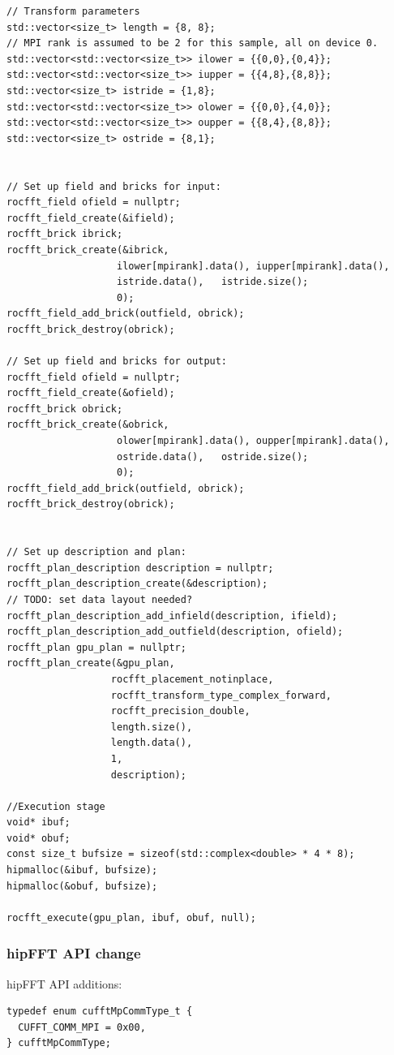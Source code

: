 \documentclass[12pt]{article}
\renewcommand{\(}{\left(}
\renewcommand{\)}{\right)}
\begin{document}
\begin{lstlisting}
// Transform parameters
std::vector<size_t> length = {8, 8};
// MPI rank is assumed to be 2 for this sample, all on device 0.
std::vector<std::vector<size_t>> ilower = {{0,0},{0,4}};
std::vector<std::vector<size_t>> iupper = {{4,8},{8,8}};
std::vector<size_t> istride = {1,8};
std::vector<std::vector<size_t>> olower = {{0,0},{4,0}};
std::vector<std::vector<size_t>> oupper = {{8,4},{8,8}};
std::vector<size_t> ostride = {8,1};


// Set up field and bricks for input:
rocfft_field ofield = nullptr;
rocfft_field_create(&ifield);
rocfft_brick ibrick;
rocfft_brick_create(&ibrick,
                   ilower[mpirank].data(), iupper[mpirank].data(),
                   istride.data(),   istride.size();
                   0);
rocfft_field_add_brick(outfield, obrick);
rocfft_brick_destroy(obrick);

// Set up field and bricks for output:
rocfft_field ofield = nullptr;
rocfft_field_create(&ofield);
rocfft_brick obrick;
rocfft_brick_create(&obrick,
                   olower[mpirank].data(), oupper[mpirank].data(),
                   ostride.data(),   ostride.size();
                   0);
rocfft_field_add_brick(outfield, obrick);
rocfft_brick_destroy(obrick);


// Set up description and plan:
rocfft_plan_description description = nullptr;
rocfft_plan_description_create(&description);
// TODO: set data layout needed?
rocfft_plan_description_add_infield(description, ifield);
rocfft_plan_description_add_outfield(description, ofield);
rocfft_plan gpu_plan = nullptr;
rocfft_plan_create(&gpu_plan,
                  rocfft_placement_notinplace,
                  rocfft_transform_type_complex_forward,
                  rocfft_precision_double,
                  length.size(),
                  length.data(),
                  1,
                  description);

//Execution stage
void* ibuf;
void* obuf;
const size_t bufsize = sizeof(std::complex<double> * 4 * 8);
hipmalloc(&ibuf, bufsize);
hipmalloc(&obuf, bufsize);

rocfft_execute(gpu_plan, ibuf, obuf, null);
\end{lstlisting}

\subsubsection{hipFFT API change}
\noindent
hipFFT API additions:
\begin{lstlisting}
typedef enum cufftMpCommType_t {
  CUFFT_COMM_MPI = 0x00,
} cufftMpCommType;
\end{lstlisting}
\end{document}
